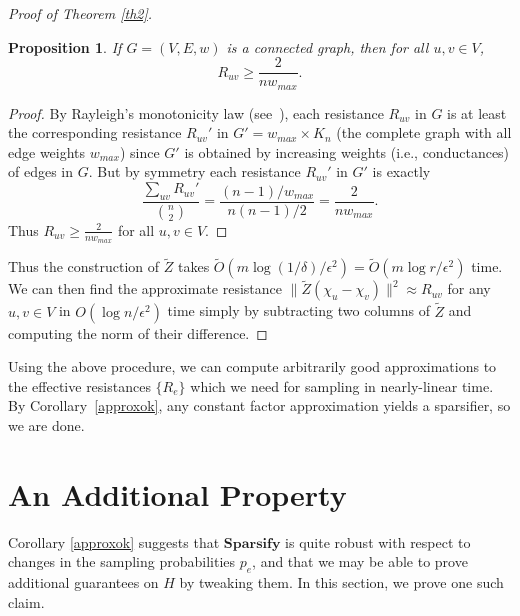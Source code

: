 \documentclass[11pt]{article}
\newtheorem{pro}[lem]{Proposition}
\newcommand{\Otilde}{\widetilde{O}}
\newcommand{\Ztilde}{\widetilde{Z}}
\newcommand{\wmx}{w_{{max}}}
\begin{document}
\begin{proof}[Proof of Theorem \ref{th2}]
\begin{pro}\label{pro:resistances}
If $G = (V,E,w)$ is a connected graph, then for all $u,v \in V$,
\[
   R_{uv} \geq   \frac{2}{n w_{max}}.
\]
\end{pro}
\begin{proof}
By Rayleigh's monotonicity law (see~\cite{bollobas}), each resistance $R_{uv}$ in $G$
	is at least the corresponding resistance $R_{uv}'$ in $G'=\wmx \times
	K_n$ (the complete graph with all edge weights $\wmx$) since $G'$ is obtained 
	by increasing weights (i.e., conductances) of edges in $G$. 
But by symmetry each resistance $R_{uv}'$ in $G'$ is exactly
	\[\frac{\sum_{uv}R_{uv}'}{\binom{n}{2}} =
	\frac{(n-1)/\wmx}{n(n-1)/2}=\frac{2}{n\wmx}.\]
Thus $R_{uv}\ge \frac{2}{n\wmx}$ for all $u,v\in V$.
\end{proof}


Thus the construction of $\Ztilde $ takes $\Otilde(m\log(1/\delta)/\epsilon^2)=\Otilde(m \log r/\epsilon^2)$ time. We can then find the approximate resistance
$\| \Ztilde (\chi_u-\chi_v)\|^2\approx R_{uv}$ for any $u,v\in V$ in $O(\log
n/\epsilon^2)$ time simply by subtracting
two columns of $\Ztilde $ and computing the norm of their difference.
\end{proof}

Using the above procedure, we can compute arbitrarily good approximations to the effective resistances
$\{R_e\}$ which we need for sampling in nearly-linear time. By Corollary~\ref{approxok}, any constant factor approximation 
yields a sparsifier, so we are done.

\section{An Additional Property}
Corollary \ref{approxok} suggests that $\mathbf{Sparsify}$ is quite robust with
respect to changes in the sampling probabilities $p_e$, and that we may be able
to prove additional guarantees on $H$ by tweaking them. In this section, we
prove one such claim. 
\end{document}
